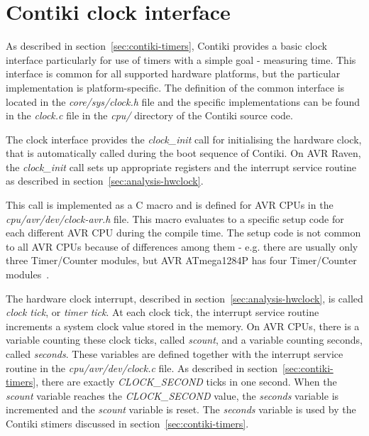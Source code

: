 
\section{Contiki clock interface}\label{sec:analysis-clock-interface}
As described in section~\ref{sec:contiki-timers},
Contiki provides a basic clock interface particularly for use of timers
with a simple goal - measuring time.
This interface is common for all supported hardware platforms,
but the particular implementation is platform-specific.
The definition of the common interface is located in the {\it{core/sys/clock.h}} file
and the specific implementations can be found in the {\it{clock.c}} file
in the {\it{cpu/}} directory of the Contiki source code.

The clock interface provides the {\it{clock\_init}} call for initialising the hardware clock,
that is automatically called during the boot sequence of Contiki.
On AVR Raven, the {\it{clock\_init}} call sets up
appropriate registers and the interrupt service routine as described in section~\ref{sec:analysis-hwclock}.

This call is implemented as a C macro and is defined for AVR CPUs in the {\it{cpu/avr/dev/clock-avr.h}} file.
This macro evaluates to a specific setup code for each different AVR CPU during the compile time.
The setup code is not common to all AVR CPUs because of differences among them - e.g. there are usually
only three Timer/Counter modules, but AVR ATmega1284P has four Timer/Counter modules~\cite{avr-datasheet}.

The hardware clock interrupt, described in section~\ref{sec:analysis-hwclock},
is called {\it{clock tick}}, or {\it{timer tick}}.
At each clock tick, the interrupt service routine increments
a system clock value stored in the memory.
On AVR CPUs, there is a variable counting these clock ticks, called {\it{scount}},
and a variable counting seconds, called {\it{seconds}}.
These variables are defined together with the interrupt service routine in the {\it{cpu/avr/dev/clock.c}} file.
As described in section~\ref{sec:contiki-timers}, there are exactly {\it{CLOCK\_SECOND}} ticks in one second.
When the {\it{scount}} variable reaches the {\it{CLOCK\_SECOND}} value,
the {\it{seconds}} variable is incremented and the {\it{scount}} variable is reset.
The {\it{seconds}} variable is used by the Contiki stimers discussed in section~\ref{sec:contiki-timers}.

